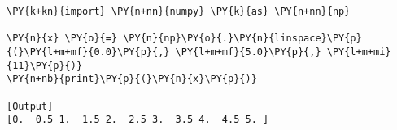 \begin{Verbatim}[label=\makebox{\href{https://bitbucket.org/lbaldini/statnotes/src/master/snippets/np.linspace.py}{https://bitbucket.org/.../np.linspace.py}},commandchars=\\\{\}]
\PY{k+kn}{import} \PY{n+nn}{numpy} \PY{k}{as} \PY{n+nn}{np}

\PY{n}{x} \PY{o}{=} \PY{n}{np}\PY{o}{.}\PY{n}{linspace}\PY{p}{(}\PY{l+m+mf}{0.0}\PY{p}{,} \PY{l+m+mf}{5.0}\PY{p}{,} \PY{l+m+mi}{11}\PY{p}{)}
\PY{n+nb}{print}\PY{p}{(}\PY{n}{x}\PY{p}{)}

[Output]
[0.  0.5 1.  1.5 2.  2.5 3.  3.5 4.  4.5 5. ]
\end{Verbatim}